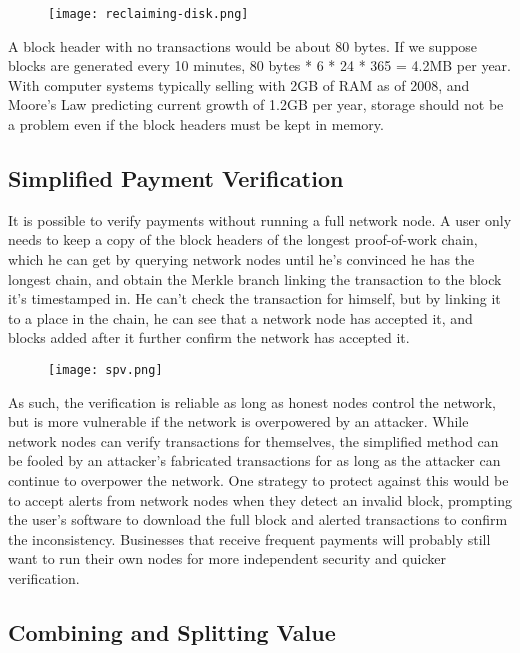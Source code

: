 \begin{figure}
\centering
\texttt{[image: reclaiming-disk.png]}
\caption{}
\end{figure}

A block header with no transactions would be about 80 bytes. If we
suppose blocks are generated every 10 minutes, 80 bytes * 6 * 24 * 365 =
4.2MB per year. With computer systems typically selling with 2GB of RAM
as of 2008, and Moore's Law predicting current growth of 1.2GB per year,
storage should not be a problem even if the block headers must be kept
in memory.

\subsection{Simplified Payment
Verification}\label{simplified-payment-verification}

It is possible to verify payments without running a full network node. A
user only needs to keep a copy of the block headers of the longest
proof-of-work chain, which he can get by querying network nodes until
he's convinced he has the longest chain, and obtain the Merkle branch
linking the transaction to the block it's timestamped in. He can't check
the transaction for himself, but by linking it to a place in the chain,
he can see that a network node has accepted it, and blocks added after
it further confirm the network has accepted it.

\begin{figure}
\centering
\texttt{[image: spv.png]}
\caption{}
\end{figure}

As such, the verification is reliable as long as honest nodes control
the network, but is more vulnerable if the network is overpowered by an
attacker. While network nodes can verify transactions for themselves,
the simplified method can be fooled by an attacker's fabricated
transactions for as long as the attacker can continue to overpower the
network. One strategy to protect against this would be to accept alerts
from network nodes when they detect an invalid block, prompting the
user's software to download the full block and alerted transactions to
confirm the inconsistency. Businesses that receive frequent payments
will probably still want to run their own nodes for more independent
security and quicker verification.

\subsection{Combining and Splitting
Value}\label{combining-and-splitting-value}

